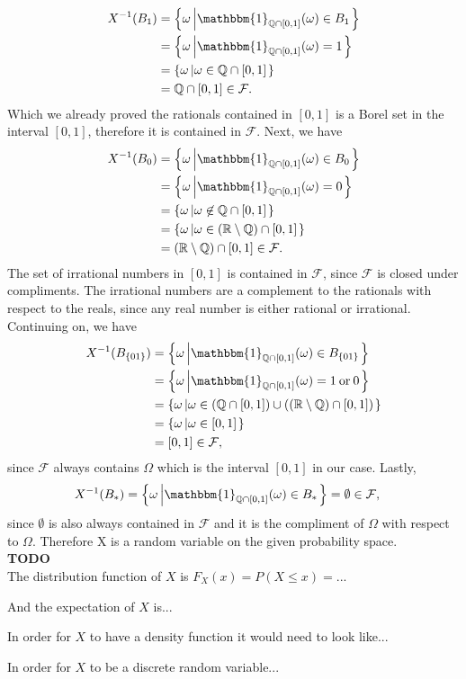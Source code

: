 \documentclass[10pt]{amsart}
\begin{document}
\begin{align*}
X^{-1}(B_1) &= \left\{ \omega \left| \mathbbm{1}_{\mathbb{Q} \cap [0, 1]}(\omega) \in B_1 \right.\right\} \\
		  &= \left\{ \omega \left| \mathbbm{1}_{\mathbb{Q} \cap [0, 1]}(\omega) = 1 \right.\right\} \\
		  &= \left\{ \omega \left| \omega \in \mathbb{Q} \cap [0, 1] \right.\right\} \\
		  &= \mathbb{Q} \cap [0, 1] \in \mathcal F.
\end{align*}
Which we already proved the rationals contained in $[0, 1]$ is a Borel set in the interval $[0, 1]$, therefore it is contained in $\mathcal F$.
Next, we have
\begin{align*}
X^{-1}(B_0) &= \left\{ \omega \left| \mathbbm{1}_{\mathbb{Q} \cap [0, 1]}(\omega) \in B_0 \right.\right\} \\
		  &= \left\{ \omega \left| \mathbbm{1}_{\mathbb{Q} \cap [0, 1]}(\omega) = 0 \right.\right\} \\
		  &= \left\{ \omega \left| \omega \not \in \mathbb{Q} \cap [0, 1] \right.\right\} \\
		  &= \left\{ \omega \left| \omega \in \left(\mathbb R \setminus \mathbb{Q}\right) \cap [0, 1] \right.\right\} \\
		  &= \left(\mathbb R \setminus \mathbb{Q}\right) \cap [0, 1] \in \mathcal F.
\end{align*}
The set of irrational numbers in $[0, 1]$ is contained in $\mathcal F$, since $\mathcal F$ is closed under compliments.
The irrational numbers are a complement to the rationals with respect to the reals, since any real number is either rational or irrational. Continuing on, we have
\begin{align*}
X^{-1}(B_{\{01\}}) &= \left\{ \omega \left| \mathbbm{1}_{\mathbb{Q} \cap [0, 1]}(\omega) \in B_{\{01\}} \right.\right\} \\
		  &= \left\{ \omega \left| \mathbbm{1}_{\mathbb{Q} \cap [0, 1]}(\omega) = 1 \: \text{or} \: 0 \right.\right\} \\
		  &= \left\{ \omega \left| \omega \in \left(\mathbb{Q} \cap [0, 1]\right) \cup \left(\left(\mathbb R \setminus \mathbb{Q}\right) \cap [0, 1]\right)\right.\right\} \\
		  &= \left\{ \omega \left| \omega \in [0, 1]\right.\right\} \\
		  &= [0, 1] \in \mathcal F,
\end{align*}
since $\mathcal F$ always contains $\Omega$ which is the interval $[0, 1]$ in our case. Lastly, 
\begin{align*}
X^{-1}(B_*) &= \left\{ \omega \left| \mathbbm{1}_{\mathbb{Q} \cap [0, 1]}(\omega) \in B_* \right.\right\} = \emptyset \in \mathcal F, 
\end{align*}
since $\emptyset$ is also always contained in $\mathcal F$ and it is the compliment of $\Omega$ with respect to $\Omega$. Therefore X is a random variable on the given probability space.
\\

\noindent
\textbf{TODO} \\
The distribution function of $X$ is $F_X(x) = P(X \leq x) = ...$

\noindent
And the expectation of $X$ is...

\noindent
In order for $X$ to have a density function it would need to look like...

\noindent
In order for $X$ to be a discrete random variable...
\end{document}
